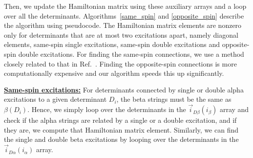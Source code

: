 \documentclass[%
preprint,
 superscriptaddress,
 amsmath,amssymb,
 aps,
]{revtex4-1}
\def\veca{\vec{\alpha}}
\def\ia{i_\alpha}
\def\ib{i_\beta}
\def\veciDa{\vec{i}_{D\alpha}}
\def\veciDb{\vec{i}_{D\beta}}
\begin{document}
%

Then, we update the Hamiltonian matrix using these auxiliary arrays and a loop over all the determinants.
Algorithms~\ref{same_spin} and \ref{opposite_spin} describe the algorithm using pseudocode.
The Hamiltonian matrix elements are nonzero only for determinants that are at most two excitations apart,
namely diagonal elements, same-spin single excitations, same-spin double excitations and opposite-spin double excitations.
For finding the same-spin connections, we use a method closely related
to that in Ref.~\cite{SceAppGinCaf-JCoC-16}.
Finding the opposite-spin connections is more computationally expensive and our algorithm speeds this up significantly.

\noindent \underline{\bf Same-spin excitations:} For determinants connected by single or double alpha excitations to a given determinant $D_i$, the beta strings must be the same as $\beta(D_i)$.
Hence, we simply loop over the determinants in the $\veciDb(\ib)$ array and check if the alpha strings are related by a single or a double excitation,
and if they are, we compute that Hamiltonian matrix element.
Similarly, we can find the single and double beta excitations by looping over the determinants in
the $\veciDa(\ia)$ array.
\end{document}
